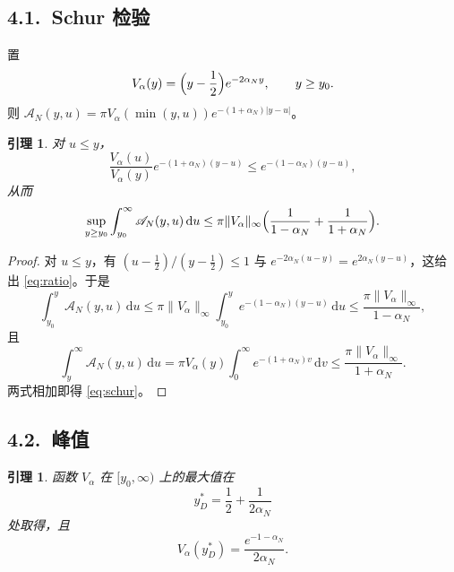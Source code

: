 \documentclass[12pt,a4paper]{amsart}
\numberwithin{equation}{section}
\theoremstyle{plain}
\newtheorem{lemma}[theorem]{引理}
\theoremstyle{definition}
\newcommand{\dd}{\,\mathrm{d}}
\begin{document}
\subsection*{4.1.\ Schur 检验}

置
\begin{equation}\label{eq:Valpha}
 V_\alpha(y)=\Bigl(y-\frac12\Bigr)e^{-2\alpha_Ny},\qquad y\ge y_0 .
\end{equation}
则 $\mathscr A_N(y,u)=\pi V_\alpha(\min(y,u))e^{-(1+\alpha_N)|y-u|}$。

\begin{lemma}\label{lem:schur}
对 $u\le y$，
\begin{equation}\label{eq:ratio}
 \frac{V_\alpha(u)}{V_\alpha(y)}e^{-(1+\alpha_N)(y-u)}
 \le e^{-(1-\alpha_N)(y-u)},
\end{equation}
从而
\begin{equation}\label{eq:schur}
 \sup_{y\ge y_0}\int_{y_0}^{\infty}\mathscr A_N(y,u)\dd u
 \le\pi\|V_\alpha\|_\infty
 \Bigl(\frac1{1-\alpha_N}+\frac1{1+\alpha_N}\Bigr).
\end{equation}
\end{lemma}

\begin{proof}
对 $u\le y$，有 $(u-\frac12)/(y-\frac12)\le1$ 与
$e^{-2\alpha_N(u-y)}=e^{2\alpha_N(y-u)}$，这给出 \eqref{eq:ratio}。于是
\[
 \int_{y_0}^{y}\mathscr A_N(y,u)\dd u
 \le\pi\|V_\alpha\|_\infty\int_{y_0}^{y}e^{-(1-\alpha_N)(y-u)}\dd u
 \le\frac{\pi\|V_\alpha\|_\infty}{1-\alpha_N},
\]
且
\[
 \int_{y}^{\infty}\mathscr A_N(y,u)\dd u
 =\pi V_\alpha(y)\int_0^{\infty}e^{-(1+\alpha_N)v}\dd v
 \le\frac{\pi\|V_\alpha\|_\infty}{1+\alpha_N}.
\]
两式相加即得 \eqref{eq:schur}。
\end{proof}

\subsection*{4.2.\ 峰值}

\begin{lemma}\label{lem:peak}
函数 $V_\alpha$ 在 $[y_0,\infty)$ 上的最大值在
\begin{equation}\label{eq:ystar}
 y_D^*=\frac12+\frac1{2\alpha_N}
\end{equation}
处取得，且
\begin{equation}\label{eq:peak}
 V_\alpha(y_D^*)=\frac{e^{-1-\alpha_N}}{2\alpha_N}.
\end{equation}
\end{lemma}
\end{document}
